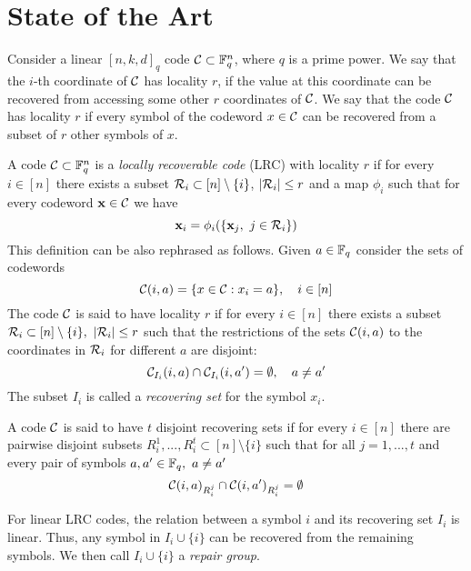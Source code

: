 \chapter{State of the Art}
Consider a linear $[n,k,d]_q$ code ${\mathcal C} \subset {\mathbb F}_q^n$, where $q$ is a prime power. We say that the $i$-th coordinate of ${\mathcal C}$ has locality $r$, if the value at this coordinate can be recovered from accessing some other $r$ coordinates of ${\mathcal C}$. We say that the code ${\mathcal C}$ has locality $r$ if every symbol of the codeword $x \in {\mathcal C}$ can be recovered from a subset of $r$ other symbols of $x$.

\begin{defn}
A code ${\mathcal C} \subset {\mathbb F}_q^n$ is a \textit{locally recoverable code} (LRC) with locality $r$ if for every $i \in [n]$ there exists a subset ${\mathcal R}_i \subset [n] \setminus \{i\}$, $\left\vert {{\mathcal R}_i} \right\vert \leq r$ and a map $\phi_i$ such that for every codeword $\mathbf{x} \in {\mathcal C}$ we have
\begin{equation}
\x_i = \phi_i(\{\x_j, \ j \in \R_i \})
\end{equation}
This definition can be also rephrased as follows. Given $a \in {\mathbb F}_q$ consider the sets of codewords
\[{\mathcal C}(i,a) = \{ x \in {\mathcal C} : x_i = a\}, \quad i \in [n]\]
The code ${\mathcal C}$ is said to have locality $r$ if for every $i \in [n]$ there exists a subset ${\mathcal R}_i \subset [n] \setminus \{i\}, \ \left\vert {{\mathcal R}_i} \right\vert \leq r$ such that the restrictions of the sets ${\mathcal C}(i,a)$ to the coordinates in ${\mathcal R}_i$ for different $a$ are disjoint:
    \begin{equation}
        {\mathcal C}_{I_i}(i,a) \cap {\mathcal C}_{I_i}(i,a') = \emptyset, \quad a \neq a'
    \end{equation}
The subset $I_i$ is called a \textit{recovering set} for the symbol $x_i$.
\end{defn}

\begin{defn}
A code ${\mathcal C}$ is said to have $t$ disjoint recovering sets if for every $i \in [n]$ there are pairwise disjoint subsets $R_i^1, ..., R_i^t \subset [n] \setminus \{i\}$ such that for all $j =1, ..., t$ and every pair of symbols $a,a' \in {\mathbb F}_q, \ a \neq a'$
\begin{equation}
{\mathcal C}(i,a)_{R_i^j} \cap {\mathcal C}(i,a')_{R_i^j} = \emptyset
\end{equation}

\end{defn}

For linear LRC codes, the relation between a symbol $i$ and its recovering set $I_i$ is linear. Thus, any symbol in $I_i \cup \{i\}$ can be recovered from the remaining symbols. We then call $I_i \cup \{i\}$ a \textit{repair group}.

